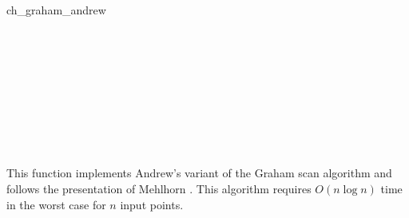 \begin{ccRefFunction}{ch_graham_andrew}
\ccSeeAlso

 \\
 \\
 \\
 \\
 \\
 \\
 \\
 \\

\ccImplementation
This function implements Andrew's variant of the Graham
scan algorithm \cite{a-aeach-79} and follows the presentation of Mehlhorn
\cite{m-mdscg-84}. This algorithm requires $O(n \log n)$ time 
in the worst case for $n$ input points.  

\end{ccRefFunction}


